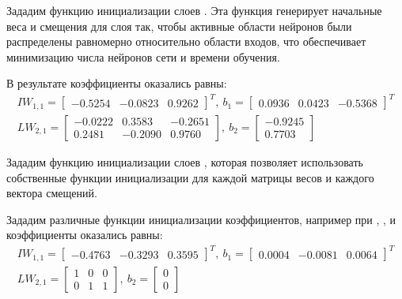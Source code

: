 

Зададим функцию инициализации слоев . Эта функция генерирует начальные веса и смещения для слоя так, чтобы активные области нейронов были распределены равномерно относительно области входов, что обеспечивает минимизацию числа нейронов сети и времени обучения.



В результате коэффициенты оказались равны:
\begin{gather*}
IW_{1,1} = \begin{bmatrix} -0.5254 & -0.0823 & 0.9262 \end{bmatrix}^T,\
b_1 = \begin{bmatrix} 0.0936 & 0.0423 & -0.5368 \end{bmatrix}^T \\
LW_{2,1} = \begin{bmatrix} -0.0222 & 0.3583 & -0.2651 \\ 0.2481 & -0.2090 & 0.9760 \end{bmatrix},\ 
b_2 = \begin{bmatrix} -0.9245 \\ 0.7703 \end{bmatrix}
\end{gather*}

Зададим функцию инициализации слоев , которая позволяет использовать собственные функции инициализации для каждой матрицы весов и каждого вектора смещений. 



Зададим различные функции инициализации коэффициентов, например при , ,  и  коэффициенты оказались равны:
\begin{gather*}
IW_{1,1} = \begin{bmatrix} -0.4763 & -0.3293 & 0.3595 \end{bmatrix}^T,\
b_1 = \begin{bmatrix} 0.0004 & -0.0081 & 0.0064 \end{bmatrix}^T \\
LW_{2,1} = \begin{bmatrix} 1 & 0 & 0 \\ 0 & 1 & 1 \end{bmatrix},\ 
b_2 = \begin{bmatrix} 0 \\ 0 \end{bmatrix}
\end{gather*}

